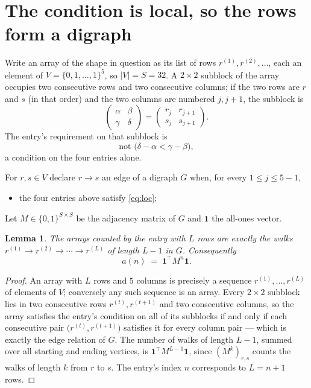 \documentclass[11pt,a4paper]{article}
\theoremstyle{plain}
\newtheorem{lemma}[theorem]{Lemma}
\theoremstyle{definition}
\begin{document}
\section{The condition is local, so the rows form a digraph}

Write an array of the shape in question as its list of rows
$r^{(1)},r^{(2)},\dots$, each an element of
$V=\{0,1,\dots,1\}^{5}$, so $|V|=S=32$. A $2\times2$ subblock of the array
occupies two consecutive rows and two consecutive columns; if the two rows are $r$
and $s$ (in that order) and the two columns are numbered $j,j+1$,
the subblock is
\[
\begin{pmatrix}\alpha&\beta\\\gamma&\delta\end{pmatrix}=\begin{pmatrix}r_j&r_{j+1}\\s_j&s_{j+1}\end{pmatrix}.
\]
The entry's requirement on that subblock is
\begin{equation}\label{eq:loc}
\text{not }\bigl(\delta-\alpha<\gamma-\beta\bigr),
\end{equation}
a condition on the four entries alone.

For $r,s\in V$ declare $r\to s$ an edge of a digraph $G$ when, for every
$1\le j\le 5-1$,
\begin{itemize}
\item the four entries above satisfy \eqref{eq:loc};

\end{itemize}
Let $M\in\{0,1\}^{S\times S}$ be the adjacency matrix of $G$ and $\mathbf{1}$ the
all-ones vector.

\begin{lemma}\label{lem:walk}
The arrays counted by the entry with $L$ rows are exactly the walks
$r^{(1)}\to r^{(2)}\to\cdots\to r^{(L)}$ of length $L-1$ in $G$. Consequently
\[
a(n)\;=\;\mathbf{1}^{\!\top}M^{n}\mathbf{1} .
\]
\end{lemma}

\begin{proof}
An array with $L$ rows and $5$ columns is precisely a sequence
$r^{(1)},\dots,r^{(L)}$ of elements of $V$; conversely any such sequence is an array.
Every $2\times2$ subblock lies in two consecutive rows $r^{(t)},r^{(t+1)}$ and two
consecutive columns, so the array satisfies the entry's condition on all of its subblocks
if and only if each consecutive pair $\bigl(r^{(t)},r^{(t+1)}\bigr)$ satisfies it for
every column pair --- which is exactly the edge relation of $G$. The number of walks of
length $L-1$, summed over all starting and ending vertices, is
$\mathbf{1}^{\!\top}M^{L-1}\mathbf{1}$, since $(M^{k})_{r,s}$ counts the walks of
length $k$ from $r$ to $s$. The entry's index $n$ corresponds to $L=n+1$ rows.
\end{proof}
\end{document}
